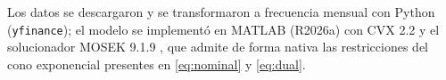 Los datos se descargaron y se transformaron a frecuencia mensual con Python (\texttt{yfinance}); el modelo se implementó en MATLAB (R2026a) con CVX 2.2 \citep{grantboyd} y el solucionador MOSEK 9.1.9 \citep{mosek}, que admite de forma nativa las restricciones del cono exponencial presentes en \eqref{eq:nominal} y \eqref{eq:dual}. 
